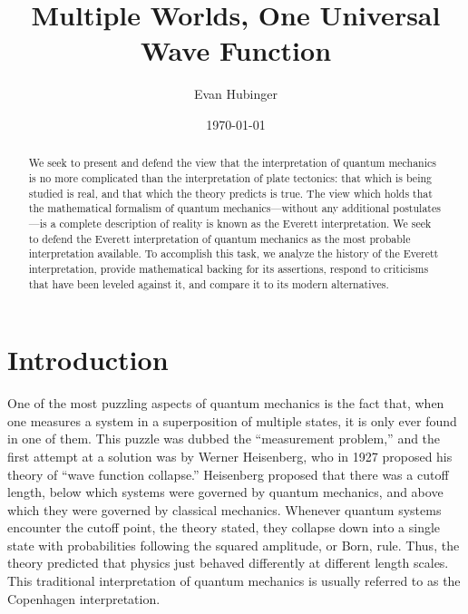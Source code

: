 \documentclass[
    12pt,
    letterpaper,
    aps,
    prd,
    longbibliography,
    twocolumn,
    nofootinbib,
    raggedbottom,
    amsmath,
    amssymb,
    amsfonts,
]{revtex4-1}
\begin{document}
\title{Multiple Worlds, One Universal Wave Function}
\author{Evan Hubinger}
\date{\today}

\begin{abstract}
We seek to present and defend the view that the interpretation of quantum mechanics is no more complicated than the interpretation of plate tectonics: that which is being studied is real, and that which the theory predicts is true. The view which holds that the mathematical formalism of quantum mechanics---without any additional postulates---is a complete description of reality is known as the Everett interpretation. We seek to defend the Everett interpretation of quantum mechanics as the most probable interpretation available. To accomplish this task, we analyze the history of the Everett interpretation, provide mathematical backing for its assertions, respond to criticisms that have been leveled against it, and compare it to its modern alternatives.
\end{abstract}

\maketitle

\section{Introduction}

One of the most puzzling aspects of quantum mechanics is the fact that, when one measures a system in a superposition of multiple states, it is only ever found in one of them. This puzzle was dubbed the ``measurement problem,'' and the first attempt at a solution was by Werner Heisenberg, who in 1927 proposed his theory of ``wave function collapse.''\cite{heisenberg} Heisenberg proposed that there was a cutoff length, below which systems were governed by quantum mechanics, and above which they were governed by classical mechanics. Whenever quantum systems encounter the cutoff point, the theory stated, they collapse down into a single state with probabilities following the squared amplitude, or Born, rule. Thus, the theory predicted that physics just behaved differently at different length scales. This traditional interpretation of quantum mechanics is usually referred to as the Copenhagen interpretation.
\end{document}
